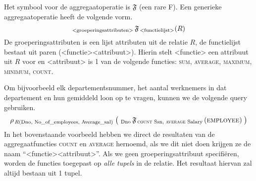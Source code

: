 Het symbool voor de aggregaatoperatie is $\mathfrak{F}$ (een rare F). Een generieke aggregaatoperatie heeft de volgende vorm.
\vspace{-2mm}
\[ _\text{{\textless}groeperingsattributen{\textgreater}} \,\mathfrak{F}_{\, \text{{\textless}functielijst{\textgreater}}}(R) \]
De groeperingsattributen is een lijst attributen uit de relatie $R$, de functielijst bestaat uit paren ({\textless}functie{\textgreater}{\textless}attribuut{\textgreater}). Hierin stelt {\textless}functie{\textgreater} een attribuut uit $R$ voor en {\textless}attribuut{\textgreater} is 1 van de volgende functies: \textsc{sum}, \textsc{average}, \textsc{maximum}, \textsc{minimum}, \textsc{count}.

Om bijvoorbeeld elk departementsnummer, het aantal werknemers in dat departement en hun gemiddeld loon op te vragen, kunnen we de volgende query gebruiken.
\vspace{-2mm}
\[ \rho_{\,R( \text{Dno, No\_of\_employees, Average\_sal} )} \;\big( ~_{\text{Dno}} \,\mathfrak{F}_{\, \text{\textsc{count} Ssn, \textsc{average} Salary}} \,(\textsc{employee}) \;\big) \]
In het bovenstaande voorbeeld hebben we direct de resultaten van de aggregaatfuncties \textsc{count} en \textsc{average} hernoemd, als we dit niet doen krijgen ze de naam ``{\textless}functie{\textgreater}\underline{\hspace{4mm}}{\textless}attribuut{\textgreater}''. Als we geen groeperingsattribuut specifi\"eren, worden de functies toegepast op \textit{alle tupels} in de relatie. Het resultaat hiervan zal altijd bestaan uit 1 tupel.

~

